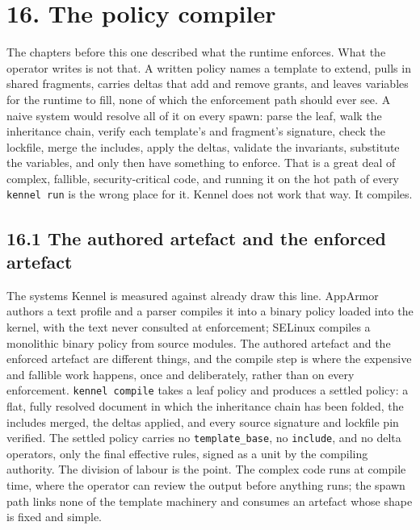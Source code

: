 \hypertarget{the-policy-compiler}{%
\chapter{16. The policy compiler}\label{the-policy-compiler}}

The chapters before this one described what the runtime enforces. What
the operator writes is not that. A written policy names a template to
extend, pulls in shared fragments, carries deltas that add and remove
grants, and leaves variables for the runtime to fill, none of which the
enforcement path should ever see. A naive system would resolve all of it
on every spawn: parse the leaf, walk the inheritance chain, verify each
template's and fragment's signature, check the lockfile, merge the
includes, apply the deltas, validate the invariants, substitute the
variables, and only then have something to enforce. That is a great deal
of complex, fallible, security-critical code, and running it on the hot
path of every \texttt{kennel\ run} is the wrong place for it. Kennel
does not work that way. It compiles.

\hypertarget{the-authored-artefact-and-the-enforced-artefact}{%
\section{16.1 The authored artefact and the enforced
artefact}\label{the-authored-artefact-and-the-enforced-artefact}}

The systems Kennel is measured against already draw this line. AppArmor
authors a text profile and a parser compiles it into a binary policy
loaded into the kernel, with the text never consulted at enforcement;
SELinux compiles a monolithic binary policy from source modules. The
authored artefact and the enforced artefact are different things, and
the compile step is where the expensive and fallible work happens, once
and deliberately, rather than on every enforcement.
\texttt{kennel\ compile} takes a leaf policy and produces a settled
policy: a flat, fully resolved document in which the inheritance chain
has been folded, the includes merged, the deltas applied, and every
source signature and lockfile pin verified. The settled policy carries
no \texttt{template\_base}, no \texttt{include}, and no delta operators,
only the final effective rules, signed as a unit by the compiling
authority. The division of labour is the point. The complex code runs at
compile time, where the operator can review the output before anything
runs; the spawn path links none of the template machinery and consumes
an artefact whose shape is fixed and simple.

